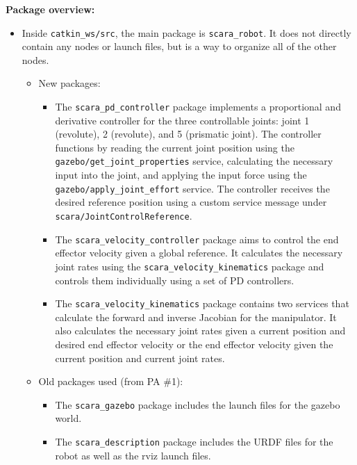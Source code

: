 \documentclass[10pt]{article}
\begin{document}
\setlength{\abovedisplayskip}{6pt}
\setlength{\belowdisplayskip}{3pt}
\setlength{\abovedisplayshortskip}{4pt}
\setlength{\belowdisplayshortskip}{4pt}

\textbf{Package overview:}
\begin{itemize}
	\item Inside \texttt{catkin\_ws/src}, the main package is \texttt{scara\_robot}. It does not directly contain any nodes or launch files, but is a way to organize all of the other nodes.
	\begin{itemize}
		\item New packages:
		\begin{itemize}
			\item The \texttt{scara\_pd\_controller} package implements a proportional and derivative controller for the three controllable joints: joint 1 (revolute), 2 (revolute), and 5 (prismatic joint). The controller functions by reading the current joint position using the \\ \texttt{gazebo/get\_joint\_properties} service, calculating the necessary input into the joint, and applying the input force using the \texttt{gazebo/apply\_joint\_effort} service. The controller receives the desired reference position using a custom service message under \texttt{scara/JointControlReference}.
			\item The \texttt{scara\_velocity\_controller} package aims to control the end effector velocity given a global reference. It calculates the necessary joint rates using the \texttt{scara\_velocity\_kinematics} package and controls them individually using a set of PD controllers.
			\item The \texttt{scara\_velocity\_kinematics} package contains two services that calculate the forward and inverse Jacobian for the manipulator. It also calculates the necessary joint rates given a current position and desired end effector velocity or the end effector velocity given the current position and current joint rates.
		\end{itemize}
		
		\item Old packages used (from PA \#1):
		\begin{itemize}
			\item The \texttt{scara\_gazebo} package includes the launch files for the gazebo world.
			\item The \texttt{scara\_description} package includes the URDF files for the robot as well as the rviz launch files.
		\end{itemize}
	\end{itemize}
\end{itemize}
\vspace{0.5cm}
\end{document}
